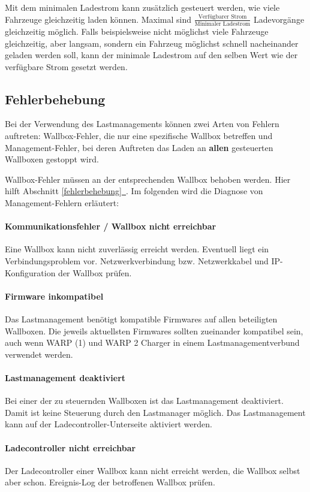\documentclass[a4paper,10pt]{article}
\newcommand*{\fullref}[1]{\hyperref[{#1}]{\ref*{#1}~\nameref*{#1}}}
\begin{document}
\begin{multicols*}{2}
	Mit dem minimalen Ladestrom kann zusätzlich gesteuert werden, wie viele Fahrzeuge gleichzeitig laden können.
	Maximal sind $\frac{\text{Verfügbarer Strom}}{\text{Minimaler Ladestrom}}$ Ladevorgänge gleichzeitig möglich. Falls beispielsweise nicht möglichst viele
	Fahrzeuge gleichzeitig, aber langsam, sondern ein Fahrzeug möglichst schnell nacheinander geladen werden soll, kann der minimale Ladestrom auf den selben Wert
	wie der verfügbare Strom gesetzt werden.

	\subsection{Fehlerbehebung}
	Bei der Verwendung des Lastmanagements können zwei Arten von Fehlern auftreten: Wallbox-Fehler, die nur eine spezifische Wallbox betreffen und Management-Fehler,
	bei deren Auftreten das Laden an \textbf{allen} gesteuerten Wallboxen gestoppt wird.

	Wallbox-Fehler müssen an der entsprechenden Wallbox behoben werden. Hier hilft Abschnitt \fullref{fehlerbehebung}. Im folgenden wird die Diagnose von Management-Fehlern erläutert:

	\paragraph{Kommunikationsfehler / Wallbox nicht erreichbar}
	Eine Wallbox kann nicht zuverlässig erreicht werden. Eventuell liegt ein Verbindungsproblem vor. Netzwerkverbindung bzw. Netzwerkkabel und IP-Konfiguration der Wallbox prüfen.

	\paragraph{Firmware inkompatibel}
	Das Lastmanagement benötigt kompatible Firmwares auf allen beteiligten Wallboxen. Die jeweils aktuellsten Firmwares sollten zueinander kompatibel sein,
	auch wenn WARP (1) und WARP 2 Charger in einem Lastmanagementverbund verwendet werden.

	\paragraph{Lastmanagement deaktiviert}
	Bei einer der zu steuernden Wallboxen ist das Lastmanagement deaktiviert. Damit ist keine Steuerung durch den Lastmanager möglich. Das Lastmanagement kann auf der Ladecontroller-Unterseite aktiviert werden.

	\paragraph{Ladecontroller nicht erreichbar}
	Der Ladecontroller einer Wallbox kann nicht erreicht werden, die Wallbox selbst aber schon. Ereignis-Log der betroffenen Wallbox prüfen.


\end{multicols*}
\end{document}
